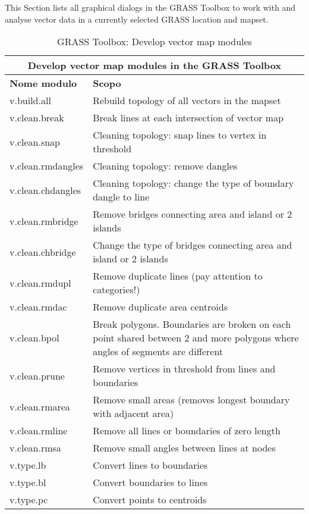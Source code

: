 This Section lists all graphical dialogs in the GRASS Toolbox to work with
and analyse vector data in a currently selected GRASS location and mapset.

\begin{table}[ht]
\centering
\caption{GRASS Toolbox: Develop vector map modules}\medskip
 \begin{tabular}{|p{4cm}|p{12cm}|}
  \hline \multicolumn{2}{|c|}{\textbf{Develop vector map modules in the GRASS
  Toolbox}} \\
  \hline \textbf{Nome modulo} & \textbf{Scopo} \\
  \hline v.build.all & Rebuild topology of all vectors in the mapset \\
  \hline v.clean.break & Break lines at each intersection of vector map \\
  \hline v.clean.snap & Cleaning topology: snap lines to vertex in threshold \\
  \hline v.clean.rmdangles & Cleaning topology: remove dangles \\
  \hline v.clean.chdangles & Cleaning topology: change the type of boundary
  dangle to line \\
  \hline v.clean.rmbridge & Remove bridges connecting area and island or 2
  islands \\
  \hline v.clean.chbridge & Change the type of bridges connecting area and
  island or 2 islands \\
  \hline v.clean.rmdupl & Remove duplicate lines (pay attention to
  categories!) \\
  \hline v.clean.rmdac & Remove duplicate area centroids \\
  \hline v.clean.bpol & Break polygons. Boundaries are broken on each
  point shared between 2 and more polygons where angles of segments are
  different \\
  \hline v.clean.prune & Remove vertices in threshold from lines and
  boundaries \\
  \hline v.clean.rmarea & Remove small areas (removes longest boundary with
  adjacent area) \\
  \hline v.clean.rmline & Remove all lines or boundaries of zero length \\
  \hline v.clean.rmsa & Remove small angles between lines at nodes \\
  \hline v.type.lb & Convert lines to boundaries \\
  \hline v.type.bl & Convert boundaries to lines \\
  \hline v.type.pc & Convert points to centroids \\

\end{tabular}
\end{table}
